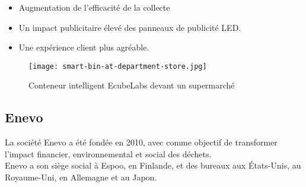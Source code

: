\documentclass[a4paper,12pt]{report}
\begin{document}
\begin{itemize}
\item Augmentation de l'efficacité de la collecte
\item Un impact publicitaire élevé des panneaux de publicité LED.
\item Une expérience client plus agréable.
\end{itemize}
\begin {figure}[H]
\begin{center} \texttt{[image: smart-bin-at-department-store.jpg]}
\caption{Conteneur intelligent EcubeLabs devant un supermarché \cite{ref8}}
\label{pub}

\end{center}
\end{figure}

\subsection{Enevo}
La société Enevo a été fondée en 2010, avec comme objectif de transformer l'impact financier, environnemental et social des déchets.\\
Enevo a son siège social à Espoo, en Finlande, et des bureaux aux États-Unis, au Royaume-Uni, en Allemagne et au Japon.\cite{ref9}\\
\end{document}
